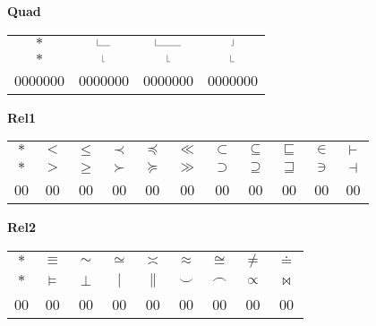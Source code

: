 \documentclass[12pt]{report}
\newlength{\mine}
\newlength{\niz}
\def\pmb{}
\newcommand{\demowidth}[1]{\rule{0.3pt}{1.3ex}\rule{#1}{0.3pt}}
\newcommand{\negdemowidth}[1]{\rule{#1}{0.3pt}\rule{0.3pt}{1.3ex}}
\begin{document}
\textbf{Quad}
\par\nobreak\vspace{2mm}
\begin{tabular}{|c|ccc|}
  \hline
   $\pmb *         $&
   $\demowidth{1em}$&
   $\demowidth{2em}$&
   $\negdemowidth{0.166em}$\\[\mine]
   $\pmb *         $&
   $\demowidth{0.166em}$&
   $\demowidth{0.222em}$&
   $\demowidth{0.277em}$\\[\niz]
  \hline\hline
  0000000&0000000&0000000&0000000\\
  \hline
\end{tabular}
\goodbreak\par\vspace{3mm}

\newpage

\textbf{Rel1}
\par\nobreak\vspace{2mm}
\begin{tabular}{|c|cccccccccc|}
  \hline
   $\pmb *         $&
   $\pmb <         $&
   $\pmb\leq       $&
   $\pmb\prec      $&
   $\pmb\preceq    $&
   $\pmb\ll        $&
   $\pmb\subset    $&
   $\pmb\subseteq  $&
   $\pmb\sqsubseteq$&
   $\pmb\in        $&
   $\pmb\vdash     $\\[\mine]
   $\pmb *         $&
   $\pmb >         $&
   $\pmb\geq       $&
   $\pmb\succ      $&
   $\pmb\succeq    $&
   $\pmb\gg        $&
   $\pmb\supset    $&
   $\pmb\supseteq  $&
   $\pmb\sqsupseteq$&
   $\pmb\ni        $&
   $\pmb\dashv     $\\[\niz]
  \hline\hline
  00&00&00&00&00&00&00&00&00&00&00\\
  \hline
\end{tabular}
\goodbreak\par\vspace{3mm}

\textbf{Rel2}
\par\nobreak\vspace{2mm}
\begin{tabular}{|c|cccccccc|}
  \hline
   $\pmb *         $&
   $\pmb\equiv     $&
   $\pmb\sim       $&
   $\pmb\simeq     $&
   $\pmb\asymp     $&
   $\pmb\approx    $&
   $\pmb\cong      $&
   $\pmb\neq       $&
   $\pmb\doteq     $\\[\mine]
   $\pmb *         $&
   $\pmb\models    $&
   $\pmb\perp      $&
   $\pmb\mid       $&
   $\pmb\parallel  $&
   $\pmb\smile     $&
   $\pmb\frown     $&
   $\pmb\propto    $&
   $\pmb\bowtie    $\\[\niz]
  \hline\hline
  00&00&00&00&00&00&00&00&00\\
  \hline
\end{tabular}
\goodbreak\par\vspace{3mm}
\end{document}
